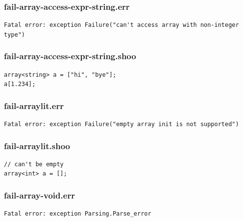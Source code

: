\documentclass[12pt]{article}
\begin{document}
\subsubsection{fail-array-access-expr-string.err}
\begin{mdframed}[hidealllines=true,backgroundcolor=green!10]
\begin{lstlisting}
Fatal error: exception Failure("can't access array with non-integer type")
\end{lstlisting}
\end{mdframed}
\subsubsection{fail-array-access-expr-string.shoo}
\begin{mdframed}[hidealllines=true,backgroundcolor=blue!10]
\begin{lstlisting}
array<string> a = ["hi", "bye"];
a[1.234];
\end{lstlisting}
\end{mdframed}
\subsubsection{fail-arraylit.err}
\begin{mdframed}[hidealllines=true,backgroundcolor=green!10]
\begin{lstlisting}
Fatal error: exception Failure("empty array init is not supported")
\end{lstlisting}
\end{mdframed}
\subsubsection{fail-arraylit.shoo}
\begin{mdframed}[hidealllines=true,backgroundcolor=blue!10]
\begin{lstlisting}
// can't be empty
array<int> a = [];
\end{lstlisting}
\end{mdframed}
\subsubsection{fail-array-void.err}
\begin{mdframed}[hidealllines=true,backgroundcolor=green!10]
\begin{lstlisting}
Fatal error: exception Parsing.Parse_error
\end{lstlisting}
\end{mdframed}
\end{document}
